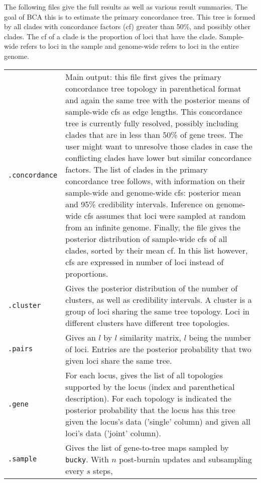 \documentclass[12pt,english,final,letterpaper]{article}
\begin{document}
\bigskip

The following files give the full results as well as various result summaries.
The goal of BCA this is to estimate the primary
concordance tree. This tree is formed by all clades with concordance 
factors ({\sc cf}) greater than 50\%, and possibly other clades. 
The {\sc cf} of a clade is the proportion of loci that have 
the clade. Sample-wide refers to loci in the sample and genome-wide 
refers to loci in the entire genome.


\noindent
\begin{tabular}{l|p{5.1in}}
{\tt .concordance}&Main output: 
this file first gives the primary concordance tree topology in parenthetical 
format and again the same tree with the posterior means of 
sample-wide {\sc cf}s  as edge lengths.
This concordance tree is currently fully resolved, possibly including
clades that are in less than 50\% of gene trees. The user might want
to unresolve those clades in case the conflicting clades have lower
but similar concordance factors.
The list of clades in the primary concordance tree follows, with 
information on their sample-wide and genome-wide {\sc cf}s: 
posterior mean and 95\% credibility intervals. Inference on 
genome-wide {\sc cf}s assumes that loci were sampled at random
from an infinite genome.
Finally, the file gives the posterior distribution of sample-wide
{\sc cf}s of all clades, sorted by their mean {\sc cf}. 
In this list however, {\sc cf}s are expressed in number of loci 
instead of proportions. \\
{\tt .cluster}&Gives the posterior distribution of the number of 
clusters, as well as credibility intervals. A cluster is a group of loci 
sharing the same tree topology. Loci in different clusters have different 
tree topologies.\\
{\tt .pairs}&Gives an $l$ by $l$ similarity matrix, $l$ being the number 
of loci. Entries are the posterior probability that two given loci share 
the same tree.\\
{\tt .gene}& For each locus, gives the list of all topologies 
supported by the locus (index and parenthetical description). For each
topology is indicated the posterior probability that the locus has this
tree given the locus's data ('single' column) and given all loci's
data ('joint' column).\\
{\tt .sample}& Gives the list of gene-to-tree maps sampled by 
{\tt bucky}. With $n$ post-burnin updates and subsampling every $s$ steps, 

\end{tabular}
\end{document}
